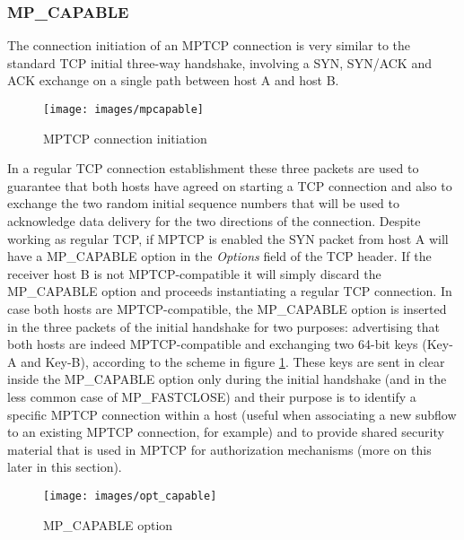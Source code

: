 \subsubsection{MP\_CAPABLE}
The connection initiation of an MPTCP connection is very similar to the standard TCP initial three-way handshake, involving a SYN, SYN/ACK and ACK exchange on a single path between host A and host B.

\begin{figure}[!htb]
\centering
\texttt{[image: images/mpcapable]}
\caption{MPTCP connection initiation}
\label{fig:mpcapable}
\end{figure}

In a regular TCP connection establishment these three packets are used to guarantee that both hosts have agreed on starting a TCP connection and also to exchange the two random initial sequence numbers that will be used to acknowledge data delivery for the two directions of the connection. Despite working as regular TCP, if MPTCP is enabled the SYN packet from host A will have a MP\_CAPABLE option in the \textit{Options} field of the TCP header. If the receiver host B is not MPTCP-compatible it will simply discard the MP\_CAPABLE option and proceeds instantiating a regular TCP connection.
In case both hosts are MPTCP-compatible, the MP\_CAPABLE option is inserted in the three packets of the initial handshake for two purposes: advertising that both hosts are indeed MPTCP-compatible and exchanging two 64-bit keys (Key-A and Key-B), according to the scheme in figure \ref{fig:mpcapable}.
These keys are sent in clear inside the MP\_CAPABLE option only during the initial handshake (and in the less common case of MP\_FASTCLOSE) and their purpose is to identify a specific MPTCP connection within a host (useful when associating a new subflow to an existing MPTCP connection, for example) and to provide shared security material that is used in MPTCP for authorization mechanisms (more on this later in this section).

\begin{figure}[!htb]
\centering
\texttt{[image: images/opt\_capable]}
\caption{MP\_CAPABLE option}
\label{fig:opt_capable}
\end{figure}

